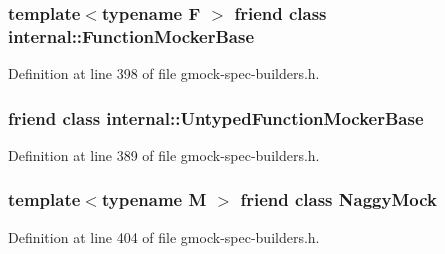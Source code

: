 \subsubsection[{\texorpdfstring{internal\+::\+Function\+Mocker\+Base}{internal::FunctionMockerBase}}]{\setlength{\rightskip}{0pt plus 5cm}template$<$typename F $>$ friend class {\bf internal\+::\+Function\+Mocker\+Base}\hspace{0.3cm}{\ttfamily [friend]}}\hypertarget{classtesting_1_1_mock_a1945aea400fdb50639e5cdf43c583687}{}\label{classtesting_1_1_mock_a1945aea400fdb50639e5cdf43c583687}


Definition at line 398 of file gmock-\/spec-\/builders.\+h.

\subsubsection[{\texorpdfstring{internal\+::\+Untyped\+Function\+Mocker\+Base}{internal::UntypedFunctionMockerBase}}]{\setlength{\rightskip}{0pt plus 5cm}friend class {\bf internal\+::\+Untyped\+Function\+Mocker\+Base}\hspace{0.3cm}{\ttfamily [friend]}}\hypertarget{classtesting_1_1_mock_aa199ba5b2fe114afc42c43912a582feb}{}\label{classtesting_1_1_mock_aa199ba5b2fe114afc42c43912a582feb}


Definition at line 389 of file gmock-\/spec-\/builders.\+h.

\subsubsection[{\texorpdfstring{Naggy\+Mock}{NaggyMock}}]{\setlength{\rightskip}{0pt plus 5cm}template$<$typename M $>$ friend class {\bf Naggy\+Mock}\hspace{0.3cm}{\ttfamily [friend]}}\hypertarget{classtesting_1_1_mock_aee2e427ecb34e6662477add3bb5f8819}{}\label{classtesting_1_1_mock_aee2e427ecb34e6662477add3bb5f8819}


Definition at line 404 of file gmock-\/spec-\/builders.\+h.

